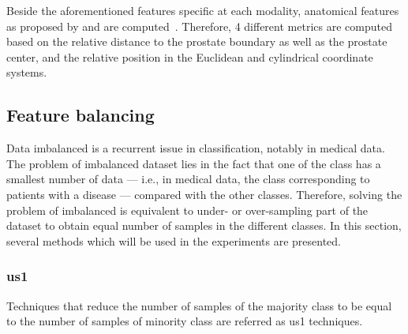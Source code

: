 Beside the aforementioned features specific at each modality, anatomical features as proposed by \citeauthor{Chen2002} and \citeauthor{Litjens2014} are computed~\cite{Chen2002,Litjens2014}.
Therefore, 4 different metrics are computed based on the relative distance to the prostate boundary as well as the prostate center, and the relative position in the Euclidean and cylindrical coordinate systems.

\subsection{Feature balancing}\label{subsec:chp6:method:fea-bal}
Data imbalanced is a recurrent issue in classification, notably in medical data.
The problem of imbalanced dataset lies in the fact that one of the class has a smallest number of data --- i.e., in medical data, the class corresponding to patients with a disease --- compared with the other classes.
Therefore, solving the problem of imbalanced is equivalent to under- or over-sampling part of the dataset to obtain equal number of samples in the different classes.
In this section, several methods which will be used in the experiments are presented.

\subsubsection{\Acl*{us1}}
Techniques that reduce the number of samples of the majority class to be equal to the number of samples of minority class are referred as \ac{us1} techniques.


